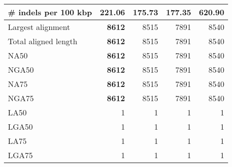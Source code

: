 \documentclass[12pt,a4paper]{article}
\begin{document}
\begin{table}[ht]
\begin{center}
\begin{tabular}{|l*{4}{|r}|}
\# indels per 100 kbp & 221.06 & {\bf 175.73} & 177.35 & 620.90 \\ \hline
Largest alignment & {\bf 8612} & 8515 & 7891 & 8540 \\ \hline
Total aligned length & {\bf 8612} & 8515 & 7891 & 8540 \\ \hline
NA50 & {\bf 8612} & 8515 & 7891 & 8540 \\ \hline
NGA50 & {\bf 8612} & 8515 & 7891 & 8540 \\ \hline
NA75 & {\bf 8612} & 8515 & 7891 & 8540 \\ \hline
NGA75 & {\bf 8612} & 8515 & 7891 & 8540 \\ \hline
LA50 & 1 & 1 & 1 & 1 \\ \hline
LGA50 & 1 & 1 & 1 & 1 \\ \hline
LA75 & 1 & 1 & 1 & 1 \\ \hline
LGA75 & 1 & 1 & 1 & 1 \\ \hline
\end{tabular}
\end{center}
\end{table}
\end{document}

